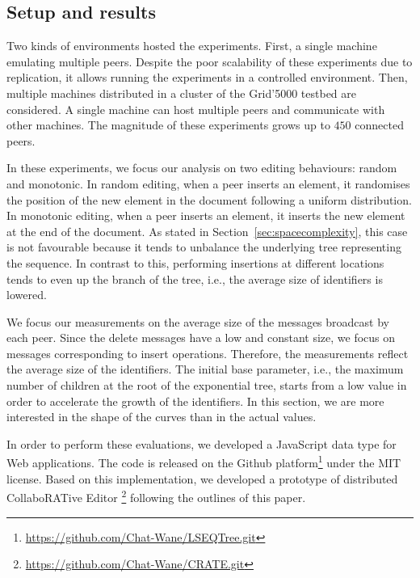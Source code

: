 \subsection{Setup and results}

Two kinds of environments hosted the experiments. First, a single machine
emulating multiple peers. Despite the poor scalability of these experiments due
to replication, it allows running the experiments in a controlled
environment. Then, multiple machines distributed in a cluster of the Grid'5000
testbed are considered. A single machine can host multiple peers and
communicate with other machines. The magnitude of these experiments grows up to
$450$ connected peers.

In these experiments, we focus our analysis on two editing behaviours: random
and monotonic. In random editing, when a peer inserts an element, it randomises
the position of the new element in the document following a uniform
distribution. In monotonic editing, when a peer inserts an element, it inserts
the new element at the end of the document. As stated in
Section~\ref{sec:spacecomplexity}, this case is not favourable because it tends
to unbalance the underlying tree representing the sequence. In contrast to
this, performing insertions at different locations tends to even up the branch
of the tree, i.e., the average size of identifiers is lowered.

We focus our measurements on the average size of the messages broadcast by each
peer. Since the delete messages have a low and constant size, we focus on
messages corresponding to insert operations. Therefore, the measurements
reflect the average size of the identifiers. The initial base parameter, i.e.,
the maximum number of children at the root of the exponential tree, starts from
a low value in order to accelerate the growth of the identifiers. In this
section, we are more interested in the shape of the curves than in the actual
values.

In order to perform these evaluations, we developed a JavaScript data type for
Web applications. The code is released on the Github
platform\footnote{\url{https://github.com/Chat-Wane/LSEQTree.git}} under the
MIT license. Based on this implementation, we developed a prototype of
distributed CollaboRATive Editor
\CRATE\footnote{\url{https://github.com/Chat-Wane/CRATE.git}} following
the outlines of this paper.
\ \\

